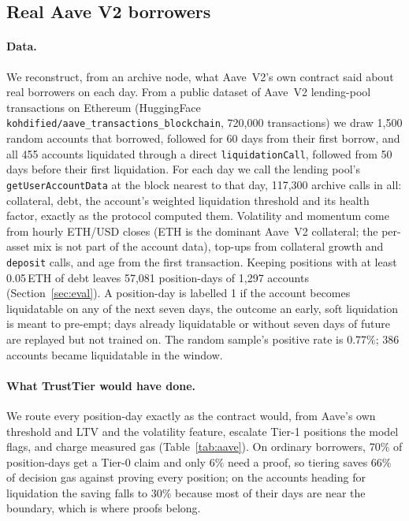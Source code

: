 \documentclass[sigconf,nonacm]{acmart}
\newcommand{\code}[1]{\texttt{\smaller #1}}
\begin{document}
\subsection{Real Aave V2 borrowers}
\label{sec:eval-real}

\paragraph{Data.} We reconstruct, from an archive node, what Aave~V2's own contract said about real borrowers on each day. From a public dataset of Aave~V2 lending-pool transactions on Ethereum (HuggingFace \code{kohdified/aave\_transactions\_blockchain}, 720,000 transactions) we draw 1,500 random accounts that borrowed, followed for 60 days from their first borrow, and all 455 accounts liquidated through a direct \code{liquidationCall}, followed from 50 days before their first liquidation. For each day we call the lending pool's \code{getUserAccountData} at the block nearest to that day, 117,300 archive calls in all: collateral, debt, the account's weighted liquidation threshold and its health factor, exactly as the protocol computed them. Volatility and momentum come from hourly ETH/USD closes (ETH is the dominant Aave~V2 collateral; the per-asset mix is not part of the account data), top-ups from collateral growth and \code{deposit} calls, and age from the first transaction. Keeping positions with at least 0.05\,ETH of debt leaves 57,081 position-days of 1,297 accounts (Section~\ref{sec:eval}). A position-day is labelled 1 if the account becomes liquidatable on any of the next seven days, the outcome an early, soft liquidation is meant to pre-empt; days already liquidatable or without seven days of future are replayed but not trained on. The random sample's positive rate is 0.77\%; 386 accounts became liquidatable in the window.

\paragraph{What TrustTier would have done.} We route every position-day exactly as the contract would, from Aave's own threshold and LTV and the volatility feature, escalate Tier-1 positions the model flags, and charge measured gas (Table~\ref{tab:aave}). On ordinary borrowers, 70\% of position-days get a Tier-0 claim and only 6\% need a proof, so tiering saves 66\% of decision gas against proving every position; on the accounts heading for liquidation the saving falls to 30\% because most of their days are near the boundary, which is where proofs belong.
\end{document}
